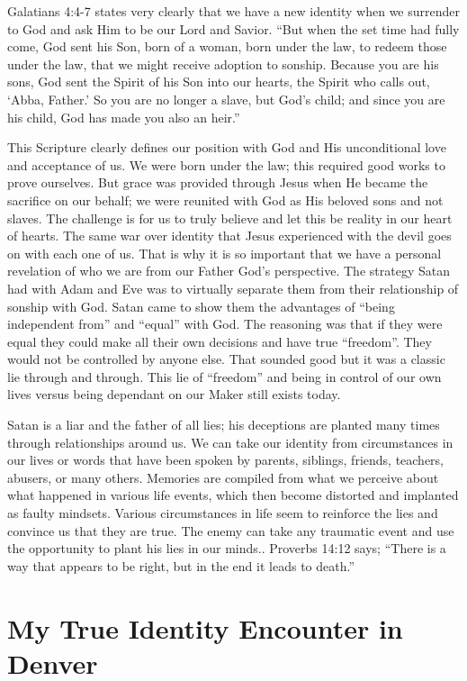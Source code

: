 \documentclass[twoside, 12pt]{book}
\begin{document}
Galatians 4:4-7 states very clearly that we have a new identity when we surrender to God and ask Him to be our Lord and Savior. “But when the set time had fully come, God sent his Son, born of a woman, born under the law, to redeem those under the law, that we might receive adoption to sonship. Because you are his sons, God sent the Spirit of his Son into our hearts, the Spirit who calls out, ‘Abba, Father.’ So you are no longer a slave, but God’s child; and since you are his child, God has made you also an heir.”

This Scripture clearly defines our position with God and His unconditional love and acceptance of us. We were born under the law; this required good works to prove ourselves. But grace was provided through Jesus when He became the sacrifice on our behalf; we were reunited with God as His beloved sons and not slaves. The challenge is for us to truly believe and let this be reality in our heart of hearts. The same war over identity that Jesus experienced with the devil goes on with each one of us. That is why it is so important that we have a personal revelation of who we are from our Father God’s perspective. The strategy Satan had with Adam and Eve was to virtually separate them from their relationship of sonship with God. Satan came to show them the advantages of “being independent from” and “equal” with God. The reasoning was that if they were equal they could make all their own decisions and have true “freedom”. They would not be controlled by anyone else. That sounded good but it was a classic lie through and through. This lie of “freedom” and being in control of our own lives versus being dependant on our Maker still exists today. 

Satan is a liar and the father of all lies; his deceptions are planted many times through relationships around us. We can take our identity from circumstances in our lives or words that have been spoken by parents, siblings, friends, teachers, abusers, or many others. Memories are compiled from what we perceive about what happened in various life events, which then become distorted and implanted as faulty mindsets. Various circumstances in life seem to reinforce the lies and convince us that they are true. The enemy can take any traumatic event and use the opportunity to plant his lies in our minds.. Proverbs 14:12 says; “There is a way that appears to be right, but in the end it leads to death.” 


\section{My True Identity Encounter in Denver}
\
\end{document}

